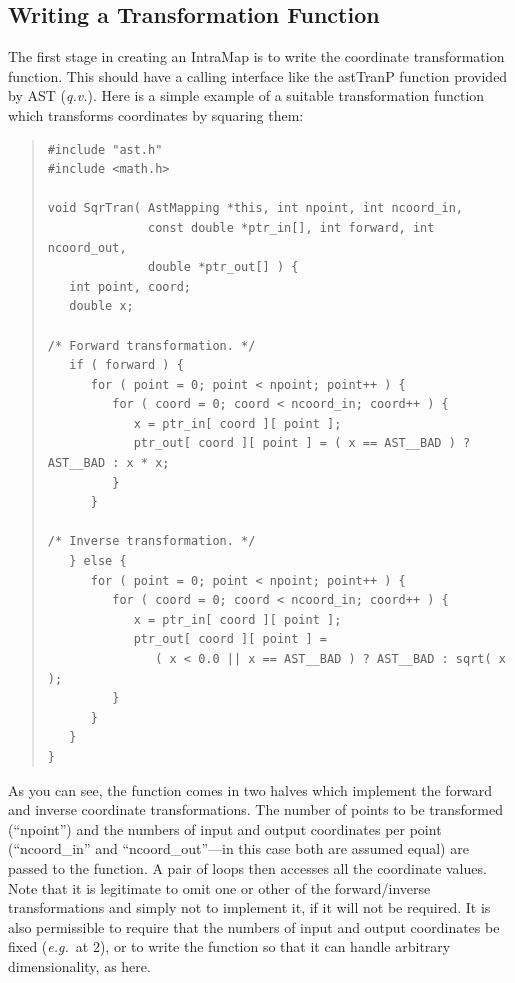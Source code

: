 \documentclass[twoside,11pt]{article}
\newcommand{\htmlref}[2]{#1}
\newcommand{\xlabel}[1]{}
\begin{document}
\subsection{\label{ss:transformationfunctions}Writing a Transformation Function}

The first stage in creating an \htmlref{IntraMap}{IntraMap} is to write the coordinate
transformation function. This should have a calling interface like the
\htmlref{astTranP}{astTranP} function provided by AST ({\em{q.v.}}). Here is a simple
example of a suitable transformation function which transforms
coordinates by squaring them:
\xlabel{SqrTran}

\begin{quote}
\small
\begin{verbatim}
#include "ast.h"
#include <math.h>

void SqrTran( AstMapping *this, int npoint, int ncoord_in,
              const double *ptr_in[], int forward, int ncoord_out,
              double *ptr_out[] ) {
   int point, coord;
   double x;

/* Forward transformation. */
   if ( forward ) {
      for ( point = 0; point < npoint; point++ ) {
         for ( coord = 0; coord < ncoord_in; coord++ ) {
            x = ptr_in[ coord ][ point ];
            ptr_out[ coord ][ point ] = ( x == AST__BAD ) ? AST__BAD : x * x;
         }
      }

/* Inverse transformation. */
   } else {
      for ( point = 0; point < npoint; point++ ) {
         for ( coord = 0; coord < ncoord_in; coord++ ) {
            x = ptr_in[ coord ][ point ];
            ptr_out[ coord ][ point ] =
               ( x < 0.0 || x == AST__BAD ) ? AST__BAD : sqrt( x );
         }
      }
   }
}
\end{verbatim}
\normalsize
\end{quote}

As you can see, the function comes in two halves which implement the
forward and inverse coordinate transformations. The number of points
to be transformed (``npoint'') and the numbers of input and output
coordinates per point (``ncoord\_in'' and ``ncoord\_out''---in this
case both are assumed equal) are passed to the function. A pair of
loops then accesses all the coordinate values.  Note that it is
legitimate to omit one or other of the forward/inverse transformations
and simply not to implement it, if it will not be required. It is also
permissible to require that the numbers of input and output
coordinates be fixed ({\em{e.g.}}\ at 2), or to write the function so
that it can handle arbitrary dimensionality, as here.
\end{document}
